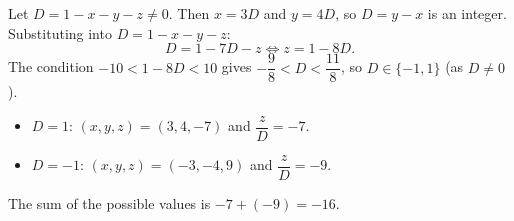 Let $D=1-x-y-z\ne0$. Then $x=3D$ and $y=4D$, so $D=y-x$ is an integer. Substituting into $D=1-x-y-z$:
\[D=1-7D-z\iff z=1-8D.\]
The condition $-10<1-8D<10$ gives $-\dfrac98<D<\dfrac{11}{8}$, so $D\in\{-1,1\}$ (as $D\ne0$).
\begin{itemize}
\item $D=1$: $(x,y,z)=(3,4,-7)$ and $\dfrac zD=-7$.
\item $D=-1$: $(x,y,z)=(-3,-4,9)$ and $\dfrac zD=-9$.
\end{itemize}
The sum of the possible values is $-7+(-9)=\boxed{-16}$.
